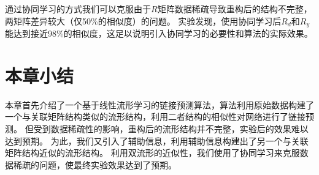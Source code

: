 通过协同学习的方式我们可以克服由于$R$矩阵数据稀疏导致重构后的结构不完整，两矩阵差异较大（仅50\%的相似度）的问题。
实验发现，使用协同学习后$R_d$和$R_y$能达到接近98\%的相似度，这足以说明引入协同学习的必要性和算法的实际效果。

\section{本章小结}
本章首先介绍了一个基于线性流形学习的链接预测算法，算法利用原始数据构建了一个与关联矩阵结构类似的流形结构，利用二者结构的相似性对网络进行了链接预测。
但受到数据稀疏性的影响，重构后的流形结构并不完整，实验后的效果难以达到预期。
为此，我们又引入了辅助信息，利用辅助信息构建出了另一个与关联矩阵结构近似的流形结构。
利用双流形的近似性，我们使用了协同学习来克服数据稀疏的问题，使最终实验效果达到了预期。
